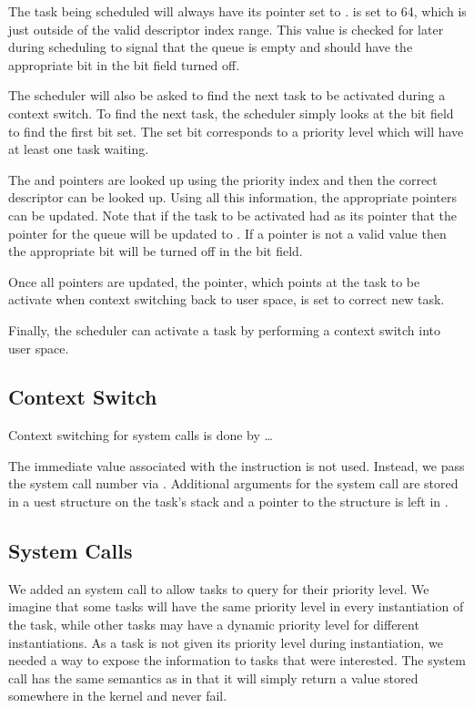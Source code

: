 \documentclass[pdftex,10pt,a4paper]{article}
\begin{document}
The task being scheduled will always have its  pointer set
to .  is set to 64, which is just
outside of the valid descriptor index range. This value is checked for
later during scheduling to signal that the queue is empty and should
have the appropriate bit in the bit field turned off.

The scheduler will also be asked to find the next task to be
activated during a context switch. To find the next task, the
scheduler simply looks at the bit field to find the first bit set. The
set bit corresponds to a priority level which will have at least one
task waiting.

The  and  pointers are looked up using the
priority index and then the correct descriptor can be looked up. Using
all this information, the appropriate pointers can be updated. Note
that if the task to be activated had  as its 
pointer that the  pointer for the queue will be updated to
. If a  pointer is not a valid value then the
appropriate bit will be turned off in the bit field.

Once all pointers are updated, the  pointer, which
points at the task to be activate when context switching back to user
space, is set to correct new task.

Finally, the scheduler can activate a task by performing a context
switch into user space.

\subsection*{Context Switch}

Context switching for system calls is done by \ldots

The immediate value associated with the  instruction is not
used. Instead, we pass the system call number via . Additional
arguments for the system call are stored in a uest
structure on the task's stack and a pointer to the structure is left
in .

\subsection*{System Calls}

We added an  system call to allow tasks to query
for their priority level. We imagine that some tasks will have the
same priority level in every instantiation of the task, while other
tasks may have a dynamic priority level for different
instantiations. As a task is not given its priority level during
instantiation, we needed a way to expose the information to tasks that
were interested. The  system call has the same
semantics as  in that it will simply return a value
stored somewhere in the kernel and never fail.
\end{document}
